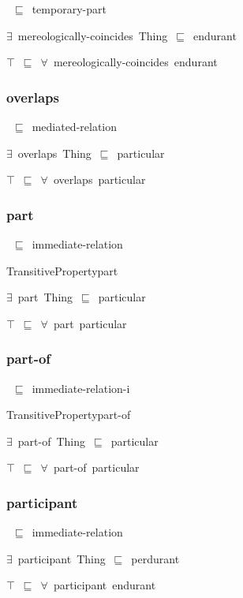 \documentclass{article}
\begin{document}
~\ensuremath{\sqsubseteq}~temporary-part

\ensuremath{\exists}~mereologically-coincides~Thing~\ensuremath{\sqsubseteq}~endurant

\ensuremath{\top}~\ensuremath{\sqsubseteq}~\ensuremath{\forall}~mereologically-coincides~endurant

\subsubsection*{overlaps}

~\ensuremath{\sqsubseteq}~mediated-relation

\ensuremath{\exists}~overlaps~Thing~\ensuremath{\sqsubseteq}~particular

\ensuremath{\top}~\ensuremath{\sqsubseteq}~\ensuremath{\forall}~overlaps~particular

\subsubsection*{part}

~\ensuremath{\sqsubseteq}~immediate-relation

TransitivePropertypart

\ensuremath{\exists}~part~Thing~\ensuremath{\sqsubseteq}~particular

\ensuremath{\top}~\ensuremath{\sqsubseteq}~\ensuremath{\forall}~part~particular

\subsubsection*{part-of}

~\ensuremath{\sqsubseteq}~immediate-relation-i

TransitivePropertypart-of

\ensuremath{\exists}~part-of~Thing~\ensuremath{\sqsubseteq}~particular

\ensuremath{\top}~\ensuremath{\sqsubseteq}~\ensuremath{\forall}~part-of~particular

\subsubsection*{participant}

~\ensuremath{\sqsubseteq}~immediate-relation

\ensuremath{\exists}~participant~Thing~\ensuremath{\sqsubseteq}~perdurant

\ensuremath{\top}~\ensuremath{\sqsubseteq}~\ensuremath{\forall}~participant~endurant
\end{document}
